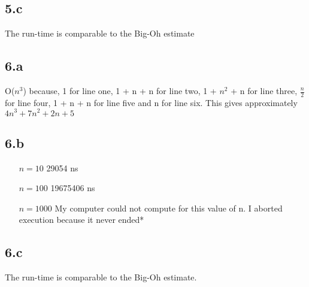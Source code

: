 \documentclass[12pt,letterpaper]{article}
\begin{document}
\subsection*{5.c}
The run-time is comparable to the Big-Oh estimate
\subsection*{6.a}
O($n^3$) because, 1 for line one, 1 + n + n for line two, 1 + $n^2$ + n for line three, $\frac{n}{2}$ for line four, 1 + n + n for line five and n for line six. This gives approximately $4n^3 + 7n^2 + 2n + 5$
\subsection*{6.b}
\begin{itemize}
\item[$n=10$] 29054 ns
\item[$n=100$] 19675406 ns
\item[$n=1000$] \scriptsize *My computer could not compute for this value of n. I aborted execution because it never ended*\small
\end{itemize}
\subsection*{6.c}
The run-time is comparable to the Big-Oh estimate.
\newpage
\end{document}
